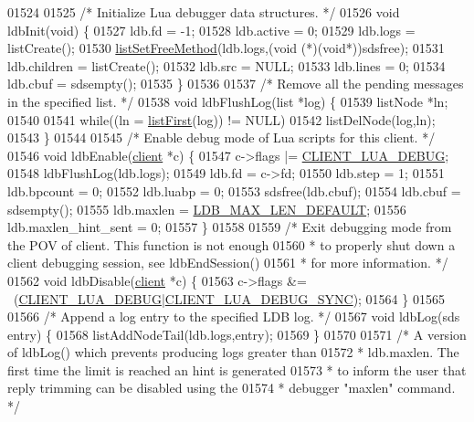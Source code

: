 \begin{DoxyCode}
{{{{{{{{{{{{01524 
01525 \textcolor{comment}{/* Initialize Lua debugger data structures. */}
01526 \textcolor{keywordtype}{void} ldbInit(\textcolor{keywordtype}{void}) \{
01527     ldb.fd = -1;
01528     ldb.active = 0;
01529     ldb.logs = listCreate();
01530     \hyperlink{adlist_8h_a648e4a2d20decff3182a72a608b0b8f2}{listSetFreeMethod}(ldb.logs,(\textcolor{keywordtype}{void} (*)(\textcolor{keywordtype}{void}*))sdsfree);
01531     ldb.children = listCreate();
01532     ldb.src = NULL;
01533     ldb.lines = 0;
01534     ldb.cbuf = sdsempty();
01535 \}
01536 
01537 \textcolor{comment}{/* Remove all the pending messages in the specified list. */}
01538 \textcolor{keywordtype}{void} ldbFlushLog(list *log) \{
01539     listNode *ln;
01540 
01541     \textcolor{keywordflow}{while}((ln = \hyperlink{adlist_8h_aa8dc514bbe217bb2e87c1c77cfa84690}{listFirst}(log)) != NULL)
01542         listDelNode(log,ln);
01543 \}
01544 
01545 \textcolor{comment}{/* Enable debug mode of Lua scripts for this client. */}
01546 \textcolor{keywordtype}{void} ldbEnable(\hyperlink{structclient}{client} *c) \{
01547     c->flags |= \hyperlink{server_8h_a59ed6554c95f9d07bf88bd62574f5946}{CLIENT\_LUA\_DEBUG};
01548     ldbFlushLog(ldb.logs);
01549     ldb.fd = c->fd;
01550     ldb.step = 1;
01551     ldb.bpcount = 0;
01552     ldb.luabp = 0;
01553     sdsfree(ldb.cbuf);
01554     ldb.cbuf = sdsempty();
01555     ldb.maxlen = \hyperlink{scripting_8c_a07ee5952305c31c72b45bebe4e78c05c}{LDB\_MAX\_LEN\_DEFAULT};
01556     ldb.maxlen\_hint\_sent = 0;
01557 \}
01558 
01559 \textcolor{comment}{/* Exit debugging mode from the POV of client. This function is not enough}
01560 \textcolor{comment}{ * to properly shut down a client debugging session, see ldbEndSession()}
01561 \textcolor{comment}{ * for more information. */}
01562 \textcolor{keywordtype}{void} ldbDisable(\hyperlink{structclient}{client} *c) \{
01563     c->flags &= ~(\hyperlink{server_8h_a59ed6554c95f9d07bf88bd62574f5946}{CLIENT\_LUA\_DEBUG}|\hyperlink{server_8h_a2f388b8fa8e4b592be374850524472e5}{CLIENT\_LUA\_DEBUG\_SYNC});
01564 \}
01565 
01566 \textcolor{comment}{/* Append a log entry to the specified LDB log. */}
01567 \textcolor{keywordtype}{void} ldbLog(sds entry) \{
01568     listAddNodeTail(ldb.logs,entry);
01569 \}
01570 
01571 \textcolor{comment}{/* A version of ldbLog() which prevents producing logs greater than}
01572 \textcolor{comment}{ * ldb.maxlen. The first time the limit is reached an hint is generated}
01573 \textcolor{comment}{ * to inform the user that reply trimming can be disabled using the}
01574 \textcolor{comment}{ * debugger "maxlen" command. */}
}}}}}}}}}}}}
\end{DoxyCode}
